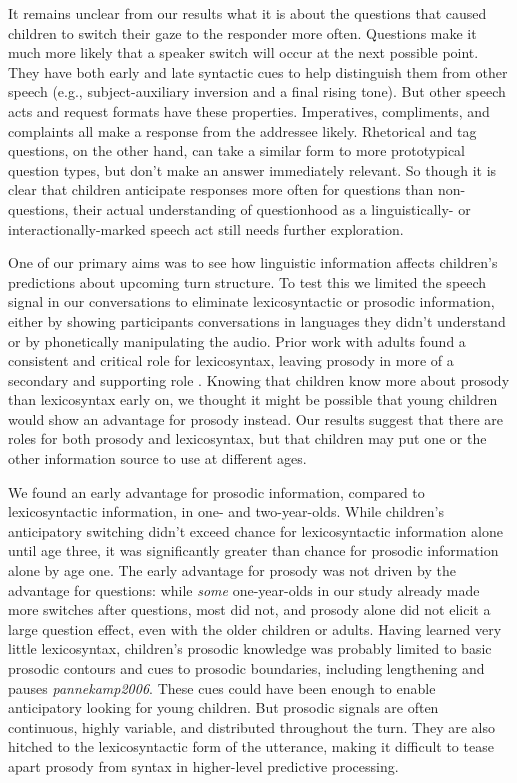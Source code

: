 \documentclass[authoryear, 12pt]{elsarticle}
\begin{document}
It remains unclear from our results what it is about the questions that caused children to switch their gaze to the responder more often. Questions make it much more likely that a speaker switch will occur at the next possible point. They have both early and late syntactic cues to help distinguish them from other speech (e.g., subject-auxiliary inversion and a final rising tone). But other speech acts and request formats have these properties. Imperatives, compliments, and complaints all make a response from the addressee likely. Rhetorical and tag questions, on the other hand, can take a similar form to more prototypical question types, but don't make an answer immediately relevant. So though it is clear that children anticipate responses more often for questions than non-questions, their actual understanding of questionhood as a linguistically- or interactionally-marked speech act still needs further exploration.

One of our primary aims was to see how linguistic information affects children's predictions about upcoming turn structure. To test this we limited the speech signal in our conversations to eliminate lexicosyntactic or prosodic information, either by showing participants conversations in languages they didn't understand or by phonetically manipulating the audio. Prior work with adults found a consistent and critical role for lexicosyntax, leaving prosody in more of a secondary and supporting role \citep{de-ruiter2006, magyari2012}. Knowing that children know more about prosody than lexicosyntax early on, we thought it might be possible that young children would show an advantage for prosody instead. Our results suggest that there are roles for both prosody and lexicosyntax, but that children may put one or the other information source to use at different ages.

We found an early advantage for prosodic information, compared to lexicosyntactic information, in one- and two-year-olds. While children's anticipatory switching didn't exceed chance for lexicosyntactic information alone until age three, it was significantly greater than chance for prosodic information alone by age one. The early advantage for prosody was not driven by the advantage for questions: while \textit{some} one-year-olds in our study already made more switches after questions, most did not, and prosody alone did not elicit a large question effect, even with the older children or adults. Having learned very little lexicosyntax, children's prosodic knowledge was probably limited to basic prosodic contours and cues to prosodic boundaries, including lengthening and pauses \textit{pannekamp2006}. These cues could have been enough to enable anticipatory looking for young children. But prosodic signals are often continuous, highly variable, and distributed throughout the turn. They are also hitched to the lexicosyntactic form of the utterance, making it difficult to tease apart prosody from syntax in higher-level predictive processing.
\end{document}
